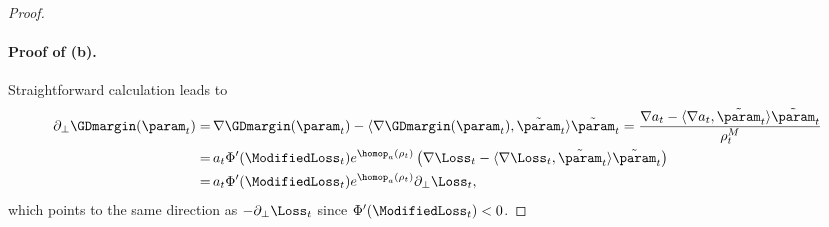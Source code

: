 \begin{proof}
\paragraph{Proof of (b).} Straightforward calculation leads to
\begin{align*}
    \partial_\perp \GDmargin(\param_t) = \, & \nabla \GDmargin (\param_t) - \langle \nabla \GDmargin(\param_t), \tilde{\param}_t \rangle \tilde{\param}_t = \frac{\nabla a_t - \langle \nabla a_t, \tilde{\param}_t \rangle \tilde{\param}_t}{\rho_t^M} \\
    = \, & a_t \Phi'(\ModifiedLoss_t) e^{\homop_a (\rho_t)} \left( \nabla \Loss_t - \langle \nabla \Loss_t, \tilde{\param}_t \rangle \tilde{\param}_t \right) \\
    = \, & a_t \Phi'(\ModifiedLoss_t) e^{\homop_a (\rho_t)} \partial_{\perp} \Loss_t,
\end{align*}
which points to the same direction as $- \partial_{\perp} \Loss_t$ since $\Phi'(\ModifiedLoss_t) < 0$.


\end{proof}
